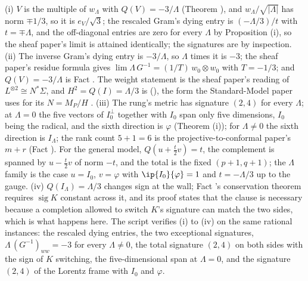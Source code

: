 (i) $V$ is the multiple of $w_{\Lambda}$ with $Q(V) = -3/\Lambda$ (Theorem ), and $w_{\Lambda}/\sqrt{|\Lambda|}$ has norm $\mp 1/3$, so it is $e_{V}/\sqrt 3$; the rescaled Gram's dying entry is $(-\Lambda/3)/t$ with $t = \mp\Lambda$, and the off-diagonal entries are zero for every $\Lambda$ by Proposition (i), so the sheaf paper's limit is attained identically; the signatures are by inspection. (ii) The inverse Gram's dying entry is $-3/\Lambda$, so $\Lambda$ times it is $-3$; the sheaf paper's residue formula gives $\lim \Lambda\, G^{-1} = (1/T)\,w_{0} \otimes w_{0}$ with $T = -1/3$; and $Q(V) = -3/\Lambda$ is Fact . The weight statement is the sheaf paper's reading of $L^{\otimes 2} \cong N^{*}\Sigma$, and $H^{2} = Q(I) = \Lambda/3$ is \cite[Fact~2.5]{ButlerT12} (), the form the Standard-Model paper uses for its $N = M_{P}/H$ \cite[Obs.~7.1]{ButlerT12}. (iii) The rung's metric has signature $(2,4)$ for every $\Lambda$; at $\Lambda = 0$ the five vectors of $I_{0}^{\perp}$ together with $I_{0}$ span only five dimensions, $I_{0}$ being the radical, and the sixth direction is $\varphi$ (Theorem (i)); for $\Lambda \neq 0$ the sixth direction is $I_{\Lambda}$; the rank count $5 + 1 = 6$ is the projective-to-conformal paper's $m + r$ (Fact ). For the general model, $Q(u + \tfrac{t}{2}v) = t$, the complement is spanned by $u - \tfrac{t}{2}v$ of norm $-t$, and the total is the fixed $(p+1,q+1)$; the $\Lambda$ family is the case $u = I_{0}$, $v = \varphi$ with $\ip{I_{0}}{\varphi} = 1$ and $t = -\Lambda/3$ up to the gauge. (iv) $Q(I_{\Lambda}) = \Lambda/3$ changes sign at the wall; Fact 's conservation theorem requires $\operatorname{sig} K$ constant across it, and its proof states that the clause is necessary because a completion allowed to switch $K$'s signature can match the two sides, which is what happens here. The script verifies (i) to (iv) on the same rational instances: the rescaled dying entries, the two exceptional signatures, $\Lambda\,(G^{-1})_{ww} = -3$ for every $\Lambda \neq 0$, the total signature $(2,4)$ on both sides with the sign of $K$ switching, the five-dimensional span at $\Lambda = 0$, and the signature $(2,4)$ of the Lorentz frame with $I_{0}$ and $\varphi$.
